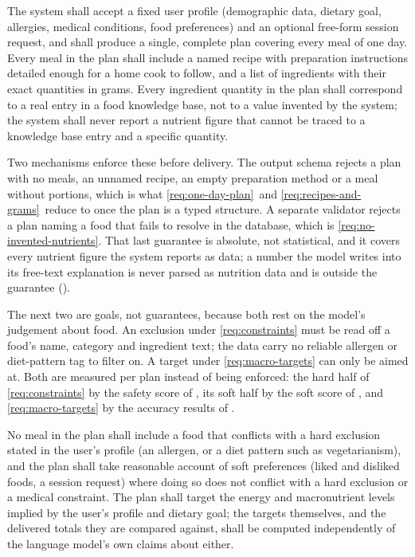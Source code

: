 \begin{description}
     The system shall accept a fixed user profile (demographic data, dietary goal, allergies, medical conditions, food preferences) and an optional free-form session request, and shall produce a single, complete plan covering every meal of one day.
     Every meal in the plan shall include a named recipe with preparation instructions detailed enough for a home cook to follow, and a list of ingredients with their exact quantities in grams.
     Every ingredient quantity in the plan shall correspond to a real entry in a food knowledge base, not to a value invented by the system; the system shall never report a nutrient figure that cannot be traced to a knowledge base entry and a specific quantity.
\end{description}

Two mechanisms enforce these before delivery. The output schema rejects a plan with no meals, an unnamed recipe, an empty preparation method or a meal without portions, which is what \ref{req:one-day-plan}~and \ref{req:recipes-and-grams}~reduce to once the plan is a typed structure. A separate validator rejects a plan naming a food that fails to resolve in the database, which is \ref{req:no-invented-nutrients}. That last guarantee is absolute, not statistical, and it covers every nutrient figure the system reports as data; a number the model writes into its free-text explanation is never parsed as nutrition data and is outside the guarantee ().

The next two are goals, not guarantees, because both rest on the model's judgement about food. An exclusion under \ref{req:constraints} must be read off a food's name, category and ingredient text; the data carry no reliable allergen or diet-pattern tag to filter on. A target under \ref{req:macro-targets} can only be aimed at. Both are measured per plan instead of being enforced: the hard half of \ref{req:constraints} by the safety score of , its soft half by the soft score of , and \ref{req:macro-targets} by the accuracy results of .

\begin{description}
     No meal in the plan shall include a food that conflicts with a hard exclusion stated in the user's profile (an allergen, or a diet pattern such as vegetarianism), and the plan shall take reasonable account of soft preferences (liked and disliked foods, a session request) where doing so does not conflict with a hard exclusion or a medical constraint.
     The plan shall target the energy and macronutrient levels implied by the user's profile and dietary goal; the targets themselves, and the delivered totals they are compared against, shall be computed independently of the language model's own claims about either.
\end{description}

